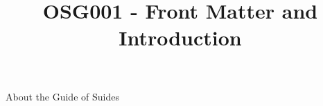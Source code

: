 \documentclass{article}
\begin{document}
\title{OSG001 - Front Matter and Introduction}

\maketitle


About the Guide of Suides
\end{document}

